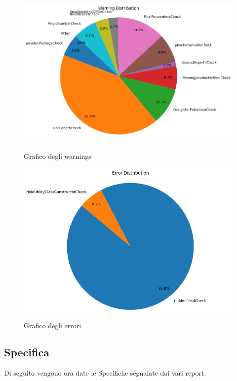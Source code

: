 \begin{figure}[H]
\begin{minipage}[b]{0.45\textwidth}
		\centering
		\includegraphics[width=\textwidth]{iterazione1/images/cucina-warning_severity_distribution_pie_chart.png}
		\caption{Grafico degli warnings}
		\label{fig:cucina-warning_severity_distribution_pie_chart}
	\end{minipage}
	\hfill
	\begin{minipage}[b]{0.45\textwidth}
		\centering
		\includegraphics[width=\textwidth]{iterazione1/images/cucina-error_severity_distribution_pie_chart.png}
		\caption{Grafico degli errori}
		\label{fig:cucina-error_severity_distribution_pie_chart}
	\end{minipage}
\end{figure}


\newpage

\subsection{Specifica}
Di seguito vengono ora date le Specifiche segnalate dai vari report.

